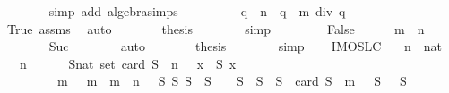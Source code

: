 \begin{isabellebody}
\ \ \ \ \ \ \isamarkupfalse%
\ {\isacharparenleft}simp\ add{\isacharcolon}\ algebra{\isacharunderscore}simps{\isacharparenright}\isanewline
\ \ \ \ \isamarkupfalse%
\ \isamarkupfalse%
\ {\isachardoublequoteopen}{\isachardot}{\isachardot}{\isachardot}\ {\isacharequal}\ {\isacharparenleft}q\ {\isacharcircum}\ {\isacharparenleft}n{\isacharplus}{}{\isacharparenright}\ {\isacharminus}\ q\ {\isacharcircum}\ m{\isacharparenright}\ div\ {\isacharparenleft}q\ {\isacharminus}\ {}{\isacharparenright}{\isachardoublequoteclose}\isanewline
\ \ \ \ \ \ \isamarkupfalse%
\ True\ assms{\isacharparenleft}{}{\isacharparenright}\ \isamarkupfalse%
\ auto\isanewline
\ \ \ \ \isamarkupfalse%
\ \isamarkupfalse%
\ {\isacharquery}thesis\isanewline
\ \ \ \ \ \ \isamarkupfalse%
\ simp\isanewline
\ \ \isamarkupfalse%
\isanewline
\ \ \ \ \isamarkupfalse%
\ False\isanewline
\ \ \ \ \isamarkupfalse%
\ {\isachardoublequoteopen}m\ {\isacharequal}\ n\ {\isacharplus}\ {}{\isachardoublequoteclose}\isanewline
\ \ \ \ \ \ \isamarkupfalse%
\ Suc{\isacharparenleft}{}{\isacharparenright}\isanewline
\ \ \ \ \ \ \isamarkupfalse%
\ auto\isanewline
\ \ \ \ \isamarkupfalse%
\ \isamarkupfalse%
\ {\isacharquery}thesis\isanewline
\ \ \ \ \ \ \isamarkupfalse%
\ simp\isanewline
\ \ \isamarkupfalse%
\isanewline
{}\isamarkupfalse%
%
\endisatagproof
{\isafoldproof}%
%
\isadelimproof
\isanewline
%
\endisadelimproof
\isanewline
\isanewline
{}\isamarkupfalse%
\ IMO{}{}{}{}SL{\isacharunderscore}C{}{\isacharcolon}\isanewline
\ \ \ n\ {\isacharcolon}{\isacharcolon}\ nat\isanewline
\ \ \ {\isachardoublequoteopen}n\ {\isasymge}\ {}{\isachardoublequoteclose}\isanewline
\ \ \ {\isachardoublequoteopen}{\isasymexists}\ {\isacharparenleft}S{\isacharcolon}{\isacharcolon}nat\ set{\isacharparenright}{\isachardot}\ card\ S\ {\isacharequal}\ {}{\isacharasterisk}n\ {\isasymand}\ {\isacharparenleft}{\isasymforall}\ x\ {\isasymin}\ S{\isachardot}\ x\ {\isachargreater}\ {}{\isacharparenright}\ {\isasymand}\ \isanewline
\ \ \ \ \ \ \ \ {\isacharparenleft}{\isasymforall}\ m{\isachardot}\ {}\ {\isasymle}\ m\ {\isasymand}\ m\ {\isasymle}\ n\ {\isasymlongrightarrow}\ {\isacharparenleft}{\isasymexists}\ S{}\ S{}{\isachardot}\ S{}\ {\isasyminter}\ S{}\ {\isacharequal}\ {\isacharbraceleft}{\isacharbraceright}\ {\isasymand}\ S{}\ {\isasymunion}\ S{}\ {\isacharequal}\ S\ {\isasymand}\ card\ S{}\ {\isacharequal}\ m\ {\isasymand}\ {\isasymSum}\ S{}\ {\isacharequal}\ {\isasymSum}\ S{}{\isacharparenright}{\isacharparenright}{\isachardoublequoteclose}\isanewline

\end{isabellebody}
